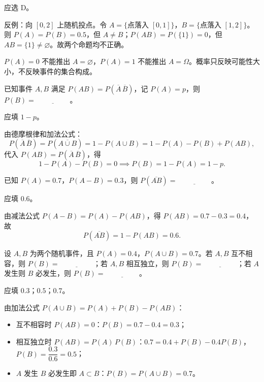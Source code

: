 \documentclass[lang=cn,11pt]{elegantbook}
\begin{document}
\begin{solution}
应选 D。

反例：向 \([0,2]\) 上随机投点。令 \(A=\{\text{点落入 }[0,1]\}\)，\(B=\{\text{点落入 }[1,2]\}\)。则 \(P(A)=P(B)=0.5\)，但 \(A\neq B\)；\(P(AB)=P(\{1\})=0\)，但 \(AB=\{1\}\neq\varnothing\)。故两个命题均不正确。
\end{solution}

\begin{note}
\(P(A)=0\) 不能推出 \(A=\varnothing\)，\(P(A)=1\) 不能推出 \(A=\Omega\)。概率只反映可能性大小，不反映事件的集合构成。
\end{note}

\begin{exercise}\label{exer:1-32}
已知事件 \(A,B\) 满足 \(P(AB)=P(\overline{A}\,\overline{B})\)，记 \(P(A)=p\)，则 \(P(B)=\underline{\hspace{2cm}}\)。
\end{exercise}

\begin{solution}
应填 \(1-p\)。

由德摩根律和加法公式：
\[P(\overline{A}\,\overline{B}) = P(\overline{A\cup B}) = 1-P(A\cup B) = 1-P(A)-P(B)+P(AB),\]
代入 \(P(AB)=P(\overline{A}\,\overline{B})\)，得
\[1-P(A)-P(B)=0 \implies P(B)=1-P(A)=1-p.\]
\end{solution}

\begin{exercise}\label{exer:1-33}
已知 \(P(A)=0.7\)，\(P(A-B)=0.3\)，则 \(P(\overline{AB})=\underline{\hspace{2cm}}\)。
\end{exercise}

\begin{solution}
应填 \(0.6\)。

由减法公式 \(P(A-B)=P(A)-P(AB)\)，得 \(P(AB)=0.7-0.3=0.4\)，故
\[P(\overline{AB}) = 1-P(AB) = 0.6.\]
\end{solution}

\begin{exercise}\label{exer:1-34}
设 \(A,B\) 为两个随机事件，且 \(P(A)=0.4\)，\(P(A\cup B)=0.7\)。若 \(A,B\) 互不相容，则 \(P(B)=\underline{\hspace{2cm}}\)；若 \(A,B\) 相互独立，则 \(P(B)=\underline{\hspace{2cm}}\)；若 \(A\) 发生则 \(B\) 必发生，则 \(P(B)=\underline{\hspace{2cm}}\)。
\end{exercise}

\begin{solution}
应填 \(0.3\)；\(0.5\)；\(0.7\)。

由加法公式 \(P(A\cup B)=P(A)+P(B)-P(AB)\)：
\begin{itemize}
    \item 互不相容时 \(P(AB)=0\)：\(P(B)=0.7-0.4=0.3\)；
    \item 相互独立时 \(P(AB)=P(A)\,P(B)\)：\(0.7=0.4+P(B)-0.4P(B)\)，\(P(B)=\dfrac{0.3}{0.6}=0.5\)；
    \item \(A\) 发生 \(B\) 必发生即 \(A\subset B\)：\(P(B)=P(A\cup B)=0.7\)。
\end{itemize}
\end{solution}
\end{document}

